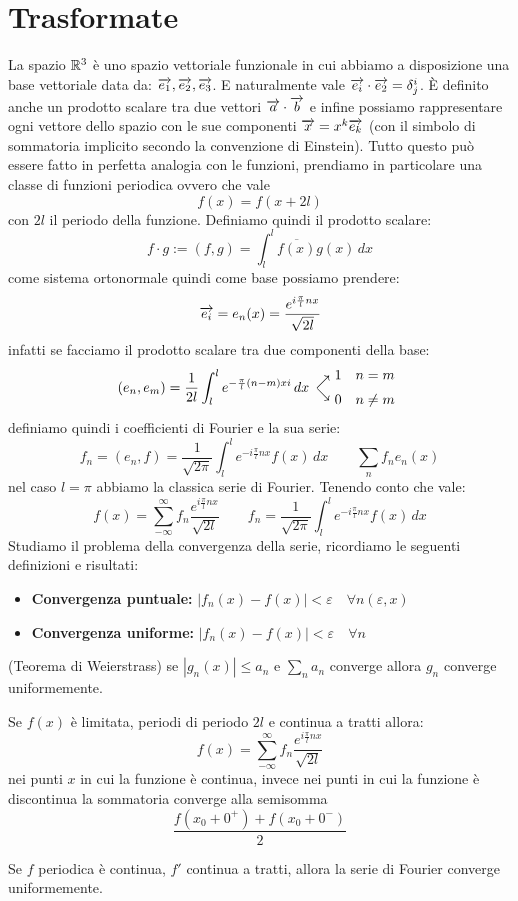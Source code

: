 \section{Trasformate}
La spazio $\mathbb{R}^3$ è uno spazio vettoriale funzionale in cui abbiamo a disposizione una base vettoriale data da: $\overrightarrow{e_1},\overrightarrow{e_2},\overrightarrow{e_3}$. E naturalmente vale $\overrightarrow{e_i}\cdot \overrightarrow{e_2} = \delta_j^i$. È definito anche un prodotto scalare tra due vettori $\overrightarrow{a}\cdot\overrightarrow{b}$ e infine possiamo rappresentare ogni vettore dello spazio con le sue componenti $\overrightarrow{x} = x^k \overrightarrow{e_k}$ (con il simbolo di sommatoria implicito secondo la convenzione di Einstein). Tutto questo può essere fatto in perfetta analogia con le funzioni, prendiamo in particolare una classe di funzioni periodica ovvero che vale
\[f(x) = f(x+2l)\]
con $2l$ il periodo della funzione. Definiamo quindi il prodotto scalare:
\[f\cdot g := (f,g) = \int_l^l \overline{f(x)}g(x)\,dx\] 
come sistema ortonormale quindi come base possiamo prendere:
\[\overrightarrow{e_i} = e_n(x) = \frac{e^{i\frac{\pi}{l}nx}}{\sqrt{2l}}\]
infatti se facciamo il prodotto scalare tra due componenti della base:
\[(e_n,e_m) = \frac{1}{2l}\int_l^l e^{-\frac{\pi}{l}(n-m)xi}\,dx \begin{array}{l@{\ }l}
    \raisebox{-1ex}{$\nearrow$} & 1 \quad  n=m\\
    \raisebox{1ex}{$\searrow$}  & 0\quad n\neq m\\
  \end{array}\]
definiamo quindi i coefficienti di Fourier e la sua serie:
\[f_n = (e_n,f) = \frac{1}{\sqrt{2\pi}}\int_l^l e^{-i\frac{\pi}{l}nx}f(x)\,dx\qquad \sum_n f_n e_n(x)\]
nel caso $l = \pi$ abbiamo la classica serie di Fourier. Tenendo conto che vale:
\[f(x) = \sum_{-\infty}^\infty f_n \frac{e^{i\frac{\pi}{l}nx}}{\sqrt{2l}} \qquad f_n = \frac{1}{\sqrt{2\pi}}\int_l^l e^{-i\frac{\pi}{l}nx}f(x)\,dx\]
Studiamo il problema della convergenza della serie, ricordiamo le seguenti definizioni e risultati:
\begin{itemize}
\item \textbf{Convergenza puntuale:} $|f_n(x)-f(x)|<\varepsilon \quad \forall n(\varepsilon,x)$
\item \textbf{Convergenza uniforme:} $|f_n(x)-f(x)|<\varepsilon \quad \forall n$
\end{itemize}
\begin{thm}
(Teorema di Weierstrass) se $|g_n(x)|\leq a_n$ e $\sum_n a_n$ converge allora $g_n$ converge uniformemente.
\end{thm}
\begin{thm}
Se $f(x)$ è limitata, periodi di periodo $2l$ e continua a tratti allora:
\[f(x) = \sum_{-\infty}^\infty f_n \frac{e^{i\frac{\pi}{l}nx}}{\sqrt{2l}}\]
nei punti $x$ in cui la funzione è continua, invece nei punti in cui la funzione è discontinua la sommatoria converge alla semisomma
\[\frac{f(x_0+0^+)+f(x_0+0^-)}{2}\]
\end{thm}
\begin{thm}
Se $f$ periodica è continua, $f'$ continua a tratti, allora la serie di Fourier converge uniformemente.
\end{thm}
